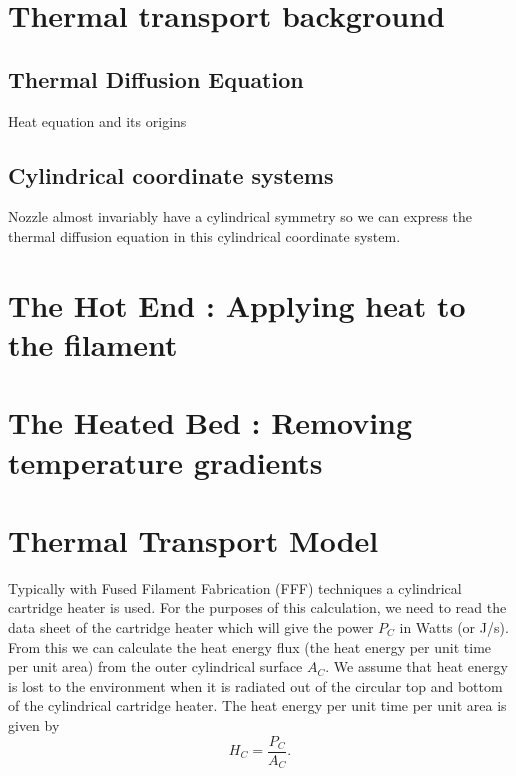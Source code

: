 
\section{Thermal transport background}

\subsection{Thermal Diffusion Equation}

Heat equation and its origins

\subsection{Cylindrical coordinate systems}

Nozzle almost invariably have a cylindrical symmetry so we can express the thermal diffusion equation in this cylindrical coordinate system. 

\section{The Hot End : Applying heat to the filament}




\section{The Heated Bed : Removing temperature gradients}

\section{Thermal Transport Model}

Typically with Fused Filament Fabrication (FFF) techniques a cylindrical cartridge heater is used. For the purposes of this calculation, we need to read the data sheet of the cartridge heater which will give the power $P_{C}$ in Watts (or J/s). From this we can calculate the heat energy flux (the heat energy per unit time per unit area) from the outer cylindrical surface $A_{C}$. We assume that heat energy is lost to the environment when it is radiated out of the circular top and bottom of the cylindrical cartridge heater. The heat energy per unit time per unit area is given by 
\begin{equation}
H_{C} = \frac{P_{C}}{A_{C}}. 
\end{equation}

